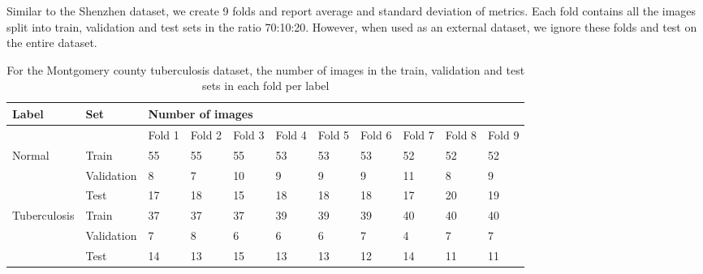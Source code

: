 \documentclass[12pt,oneside,a4paper]{report}
\begin{document}
Similar to the Shenzhen dataset, we create 9 folds and report average and
standard deviation of metrics. Each fold contains all the images split into
train, validation and test sets in the ratio 70:10:20. However, when used as an
external dataset, we ignore these folds and test on the
entire dataset.\\

\begin{landscape}
  \begin{table}[]
    \centering
    \begin{tabular}{@{}lllllllllll@{}}
      \toprule
      \textbf{Label}                & \textbf{Set} & \multicolumn{9}{l}{\textbf{Number of images}}                                                                        \\ \midrule
                                    &              & Fold 1    & Fold 2    & Fold 3    & Fold 4    & Fold 5    & Fold 6    & Fold 7    & Fold 8    & Fold 9        \\ \midrule
      \multirow{3}{*}{Normal}       & Train        & 55        & 55        & 55        & 53        & 53        & 53        & 52        & 52        & 52                  \\ \cmidrule(l){2-11} 
                                    & Validation   & 8         & 7         & 10        & 9         & 9         & 9         & 11        & 8         & 9                   \\ \cmidrule(l){2-11} 
                                    & Test         & 17        & 18        & 15        & 18        & 18        & 18        & 17        & 20        & 19                  \\ \midrule
      \multirow{3}{*}{Tuberculosis} & Train        & 37        & 37        & 37        & 39        & 39        & 39        & 40        & 40        & 40                  \\ \cmidrule(l){2-11} 
                                    & Validation   & 7         & 8         & 6         & 6         & 6         & 7         & 4         & 7         & 7                   \\ \cmidrule(l){2-11} 
                                    & Test         & 14        & 13        & 15        & 13        & 13        & 12        & 14        & 11        & 11                  \\ \bottomrule
    \end{tabular}
    \caption{For the Montgomery county tuberculosis dataset, the number of
      images in the train, validation and test sets in each fold per label}
    \label{tab:mc_split}
  \end{table}
\end{landscape}
\end{document}
